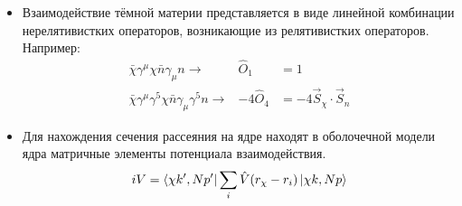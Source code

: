 \begin{itemize}
	\item Взаимодействие тёмной материи представляется в виде линейной комбинации нерелятивистких операторов, возникающие из релятивистких операторов. Например:
	\begin{eqnarray*}
		\bar{\chi}\gamma^{\mu}\chi \bar{n}\gamma_{\mu}n \rightarrow& \hat{O}_1 &= 1 \\
		\bar{\chi}\gamma^{\mu}\gamma^{5}\chi \bar{n}\gamma_{\mu}\gamma^{5}n \rightarrow& -4\hat{O}_4  &= -4 \vec{S}_{\chi}\cdot\vec{S}_{n}
	\end{eqnarray*}
	\item Для нахождения сечения рассеяния на ядре находят в оболочечной модели ядра матричные элементы 
	потенциала взаимодействия.
	\begin{equation*}
		iV = \bra{\chi k',N p'} \sum_i{\hat{V}(r_{\chi} - r_{i})} \ket{\chi k,N p}
	\end{equation*}
\end{itemize}